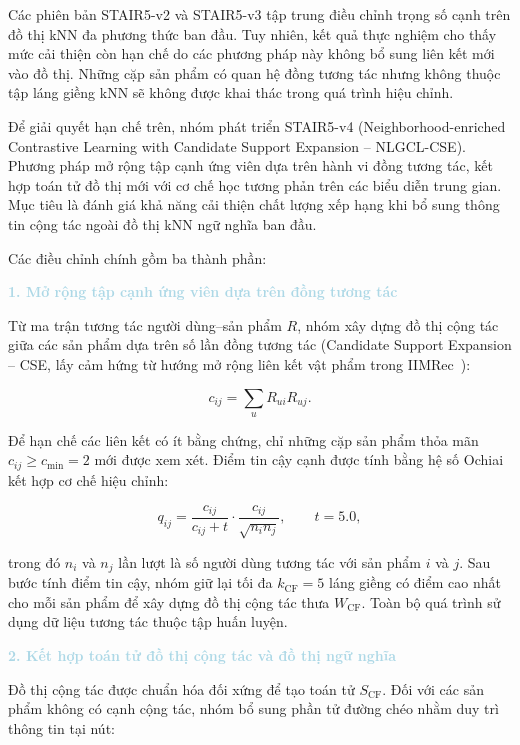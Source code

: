 Các phiên bản STAIR5-v2 và STAIR5-v3 tập trung điều chỉnh trọng số cạnh trên đồ thị kNN đa phương thức ban đầu. Tuy nhiên, kết quả thực nghiệm cho thấy mức cải thiện còn hạn chế do các phương pháp này không bổ sung liên kết mới vào đồ thị. Những cặp sản phẩm có quan hệ đồng tương tác nhưng không thuộc tập láng giềng kNN sẽ không được khai thác trong quá trình hiệu chỉnh.

Để giải quyết hạn chế trên, nhóm phát triển STAIR5-v4 (Neighborhood-enriched Contrastive Learning with Candidate Support Expansion -- NLGCL-CSE). Phương pháp mở rộng tập cạnh ứng viên dựa trên hành vi đồng tương tác, kết hợp toán tử đồ thị mới với cơ chế học tương phản trên các biểu diễn trung gian. Mục tiêu là đánh giá khả năng cải thiện chất lượng xếp hạng khi bổ sung thông tin cộng tác ngoài đồ thị kNN ngữ nghĩa ban đầu.

Các điều chỉnh chính gồm ba thành phần:

\noindent\textcolor{lightblue}{\textbf{1. Mở rộng tập cạnh ứng viên dựa trên đồng tương tác}}

Từ ma trận tương tác người dùng--sản phẩm $R$, nhóm xây dựng đồ thị cộng tác giữa các sản phẩm dựa trên số lần đồng tương tác (Candidate Support Expansion -- CSE, lấy cảm hứng từ hướng mở rộng liên kết vật phẩm trong IIMRec~\cite{xu2026iimrec}):

\begin{equation}
c_{ij}=\sum_{u}R_{ui}R_{uj}.
\end{equation}

Để hạn chế các liên kết có ít bằng chứng, chỉ những cặp sản phẩm thỏa mãn $c_{ij}\geq c_{\min}=2$ mới được xem xét. Điểm tin cậy cạnh được tính bằng hệ số Ochiai kết hợp cơ chế hiệu chỉnh:

\begin{equation}
q_{ij}=\frac{c_{ij}}{c_{ij}+t}\cdot\frac{c_{ij}}{\sqrt{n_i n_j}},
\qquad t=5.0,
\end{equation}

trong đó $n_i$ và $n_j$ lần lượt là số người dùng tương tác với sản phẩm $i$ và $j$. Sau bước tính điểm tin cậy, nhóm giữ lại tối đa $k_{\mathrm{CF}}=5$ láng giềng có điểm cao nhất cho mỗi sản phẩm để xây dựng đồ thị cộng tác thưa $W_{\mathrm{CF}}$. Toàn bộ quá trình sử dụng dữ liệu tương tác thuộc tập huấn luyện.

\noindent\textcolor{lightblue}{\textbf{2. Kết hợp toán tử đồ thị cộng tác và đồ thị ngữ nghĩa}}

Đồ thị cộng tác được chuẩn hóa đối xứng để tạo toán tử $S_{\mathrm{CF}}$. Đối với các sản phẩm không có cạnh cộng tác, nhóm bổ sung phần tử đường chéo nhằm duy trì thông tin tại nút:

